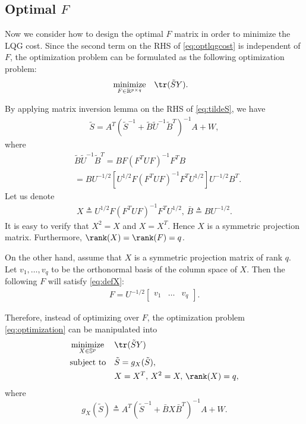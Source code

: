   \subsection{Optimal $F$}
  Now we consider how to design the optimal $F$ matrix in order to minimize the LQG cost. Since the second term on the RHS of \eqref{eq:optlqgcost} is independent of $F$, the optimization problem can be formulated as the following optimization problem: 
  \begin{align}
    &\mathop{\textrm{minimize}}\limits_{F\in\mathbb R^{p\times q}}&
    & \tr(\tilde SY). \label{eq:optimization}
  \end{align}

  By applying matrix inversion lemma on the RHS of \eqref{eq:tildeS}, we have
  \begin{align}
    \tilde S = A^T\left(\tilde S^{-1} + \tilde B \tilde U^{-1} \tilde B^T  \right)^{-1}A + W,
    \label{eq:tildeS2}
  \end{align}
  where
  \begin{align*}
    &\tilde B\tilde U^{-1}\tilde B^T = BF\left(F^TUF\right)^{-1}F^TB \\
    &= B U^{-1/2} \left[U^{1/2}F\left( F^TUF \right)^{-1}F^TU^{1/2} \right] U^{-1/2}B^T.
  \end{align*}
  Let us denote
  \begin{equation}
    \begin{split}
      X \triangleq  U^{1/2}F\left( F^TUF \right)^{-1}F^TU^{1/2},\, \bar B \triangleq BU^{-1/2}.
    \end{split}
    \label{eq:defX}
  \end{equation}
  It is easy to verify that $X^2 = X$ and $X=X^T$. Hence $X$ is a symmetric projection matrix. Furthermore, $\rank(X) = \rank(F) = q$.

  On the other hand, assume that $X$ is a symmetric projection matrix of rank $q$. Let $v_1,\dots,v_q$ to be the orthonormal basis of the column space of $X$. Then the following $F$ will satisfy \eqref{eq:defX}:
  \begin{align}
    F = U^{-1/2} \begin{bmatrix}
      v_1 & \dots&v_q
    \end{bmatrix}.
    \label{eq:XtoF}
  \end{align}

  Therefore, instead of optimizing over $F$, the optimization problem \eqref{eq:optimization} can be manipulated into
  \begin{align}
    &\mathop{\textrm{minimize}}\limits_{X\in\mathbb S^p}&
    & \tr(\tilde SY) \label{eq:optimization2}\\
    &\textrm{subject to}&
    &\tilde S = g_X(\tilde S), \nonumber\\
    &&
    &X = X^T,\,X^2 = X,\,\rank(X) = q,\nonumber
  \end{align}
  where
  \begin{equation}
    g_X(\tilde S) \triangleq A^T\left(\tilde S^{-1} +  \bar BX\bar B^T  \right)^{-1}A + W.
    \label{eq:defriccati}
  \end{equation}

